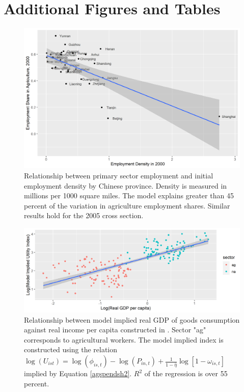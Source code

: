 \documentclass[]{article}
\theoremstyle{plain}
\begin{document}
\paragraph*{}

\newpage

\section{Additional Figures and Tables} \label{appendix:figures}

	\begin{figure}[h]
		\includegraphics[width=\textwidth]{fig1.png}
		\caption{Relationship between primary sector employment and initial employment density by Chinese province. Density is measured in millions per 1000 square miles. The model explains greater than 45 percent of the variation in agriculture employment shares. Similar results hold for the 2005 cross section.}
		\label{fig:emp_share_dens}
	\end{figure}
\newpage
\begin{figure}[h]
	\includegraphics[width=\textwidth]{model_implied_index.png}
	\caption{Relationship between model implied real GDP of goods consumption against real income per capita constructed in \cite{tombezhu}. Sector "ag" corresponds to agricultural workers. The model implied index is constructed using the relation $\log(U_{ist}) = \log(\phi_{is, t}) - \log(P_{in, t}) + \frac{1}{1-\hat{\eta}}\log[1-\omega_{is,t}]$ implied by Equation \eqref{agspendsh2}. $R^{2}$ of the regression is over 55 percent. }   
	\label{fig:model_implied_index}
\end{figure}
\end{document}
